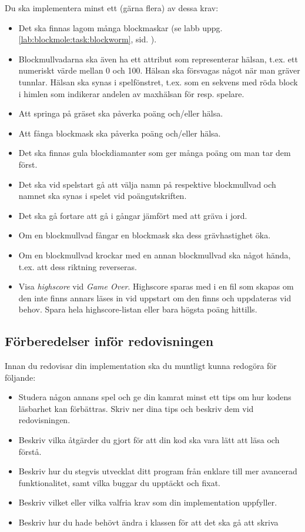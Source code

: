 Du ska implementera minst ett (gärna flera) av dessa krav:
\begin{itemize}[nosep, label={$\square$}]
\item Det ska finnas lagom många blockmaskar (se labb  uppg. \ref{lab:blockmole:task:blockworm},  sid. \pageref{lab:blockmole:task:blockworm}).
\item Blockmullvadarna ska även ha ett attribut som representerar hälsan, t.ex. ett numeriskt värde mellan 0 och 100. Hälsan ska försvagas något när man gräver tunnlar. Hälsan ska synas i spelfönstret, t.ex. som en sekvens med röda block i himlen som indikerar andelen av maxhälsan för resp. spelare.
\item Att springa på gräset ska påverka poäng och/eller hälsa.
\item Att fånga blockmask ska påverka poäng och/eller hälsa.
\item Det ska finnas gula blockdiamanter som ger många poäng om man tar dem först.
\item Det ska vid spelstart gå att välja namn på respektive blockmullvad och namnet ska synas i spelet vid poängutskriften.
\item Det ska gå fortare att gå i gångar jämfört med att gräva i jord.
\item Om en blockmullvad fångar en blockmask ska dess grävhastighet öka.
\item Om en blockmullvad krockar med en annan blockmullvad ska något hända, t.ex. att dess riktning reverseras.
\item Visa \emph{highscore} vid \emph{Game Over}.  Highscore sparas med  i en fil som skapas om den inte finns annars läses in vid uppstart om den finns och uppdateras vid behov. Spara hela highscore-listan eller bara högsta poäng hittills.
\end{itemize}

\subsection{Förberedelser inför redovisningen}
\Checkpoint\noindent Innan du redovisar din implementation ska du muntligt kunna redogöra för följande:
\begin{itemize}[nosep, label={$\square$}]
  \item Studera någon annans spel och ge din kamrat minst ett tips om hur kodens läsbarhet kan förbättras. Skriv ner dina tips och beskriv dem vid redovisningen.
  \item Beskriv vilka åtgärder du gjort för att din kod ska vara lätt att läsa och förstå.
  \item Beskriv hur du stegvis utvecklat ditt program från enklare till mer avancerad funktionalitet, samt vilka buggar du upptäckt och fixat.
  \item Beskriv vilket eller vilka valfria krav som din implementation uppfyller.
  \item Beskriv hur du hade behövt ändra i klassen  för att det ska gå att skriva\\
\end{itemize}

